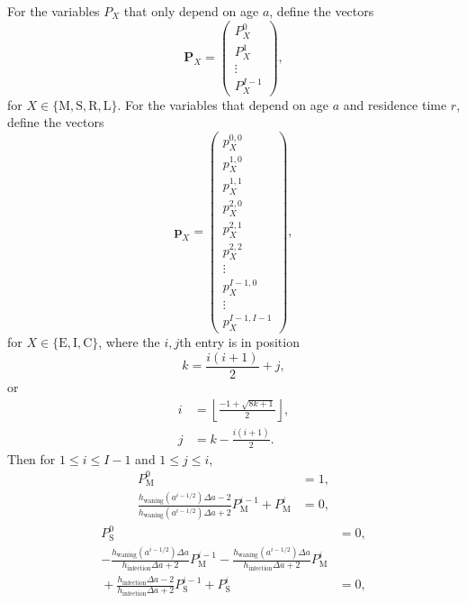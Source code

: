 \documentclass[12pt]{article}
\renewcommand{\vec}[1]{\mathbf{#1}}
\begin{document}
For the variables $P_X$ that only depend on age $a$,
define the vectors
\begin{equation}
  \vec{P}_X =
  \begin{pmatrix}
    P_X^0\\
    P_X^1\\
    \vdots\\
    P_X^{I - 1}
  \end{pmatrix},
\end{equation}
for $X \in \{\mathrm{M}, \mathrm{S}, \mathrm{R}, \mathrm{L}\}$.
For the variables that depend on age $a$ and residence time $r$,
define the vectors
\begin{equation}
  \vec{p}_X =
  \begin{pmatrix}
    p_X^{0, 0}\\
    p_X^{1, 0}\\
    p_X^{1, 1}\\
    p_X^{2, 0}\\
    p_X^{2, 1}\\
    p_X^{2, 2}\\
    \vdots\\
    p_X^{I - 1, 0}\\
    \vdots\\
    p_X^{I - 1, I - 1}
  \end{pmatrix},
\end{equation}
for $X \in \{\mathrm{E}, \mathrm{I}, \mathrm{C}\}$,
where the $i, j$th entry is in position
\begin{equation}
  k = \frac{i (i + 1)}{2} + j,
\end{equation}
or
\begin{equation}
  \begin{split}
    i &= \left\lfloor\frac{- 1 + \sqrt{8 k + 1}}{2}\right\rfloor,
    \\
    j &= k - \frac{i (i + 1)}{2}.
  \end{split}
\end{equation}
Then for $1 \leq i \leq I - 1$ and $1 \leq j \leq i$,
\begin{equation}
  \begin{split}
    P_{\mathrm{M}}^0 &= 1,
    \\
    \frac{h_{\text{waning}}(a^{i - 1 / 2}) \Delta a - 2}
    {h_{\text{waning}}(a^{i - 1 / 2}) \Delta a + 2}
    P_{\mathrm{M}}^{i - 1}
    + P_{\mathrm{M}}^i
    &= 0,
  \end{split}
\end{equation}
\begin{equation}
  \begin{split}
    P_{\mathrm{S}}^0 &= 0,
    \\
    - \frac{h_{\text{waning}}(a^{i - 1 / 2}) \Delta a}
    {h_{\text{infection}} \Delta a + 2}
    P_{\mathrm{M}}^{i - 1}
    - \frac{h_{\text{waning}}(a^{i - 1 / 2}) \Delta a}
    {h_{\text{infection}} \Delta a + 2}
    P_{\mathrm{M}}^i
    \\ {}
    + \frac{h_{\text{infection}} \Delta a - 2}
    {h_{\text{infection}} \Delta a + 2}
    P_{\mathrm{S}}^{i - 1}
    + P_{\mathrm{S}}^i
    &= 0,
  \end{split}
\end{equation}
\end{document}
